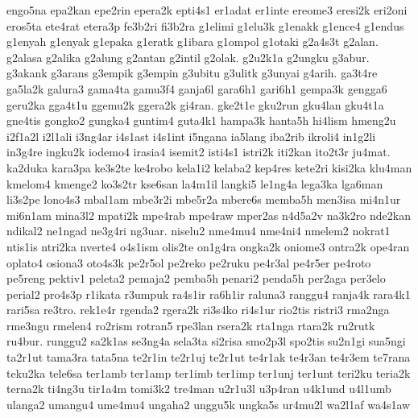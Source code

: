 {engo5na epa2kan epe2rin epera2k epti4s1 er1adat er1inte ereome3 eresi2k eri2oni eros5ta ete4rat etera3p fe3b2ri fi3b2ra g1elimi g1elu3k g1enakk g1ence4 g1endus g1enyah g1enyak g1epaka g1eratk g1ibara g1ompol g1otaki g2a4s3t g2alan. g2alasa g2alika g2alung g2antan g2intil g2olak. g2u2k1a g2ungku g3abur. g3akank g3arans g3empik g3empin g3ubitu g3ulitk g3unyai g4arih. ga3t4re ga5la2k galura3 gama4ta gamu3f4 ganja6l gara6h1 gari6h1 gempa3k gengga6 geru2ka gga4t1u ggemu2k ggera2k gi4ran. gke2t1e gku2run gku4lan gku4t1a gne4tis gongko2 gungka4 guntim4 guta4k1 hampa3k hanta5h hi4lism hmeng2u i2f1a2l i2l1ali i3ng4ar i4s1ast i4s1int i5ngana ia5lang iba2rib ikroli4 in1g2li in3g4re ingku2k iodemo4 irasia4 isemit2 isti4s1 istri2k iti2kan ito2t3r ju4mat. ka2duka kara3pa ke3s2te ke4robo kela1i2 kelaba2 kep4res kete2ri kisi2ka klu4man kmelom4 kmenge2 ko3s2tr kse6san la4m1il langki5 le1ng4a lega3ka lga6man li3s2pe lono4s3 mbal1am mbe3r2i mbe5r2a mbere6s memba5h men3isa mi4n1ur mi6n1am mina3l2 mpati2k mpe4rab mpe4raw mper2as n4d5a2v na3k2ro nde2kan ndikal2 ne1ngad ne3g4ri ng3uar. niselu2 nme4mu4 nme4ni4 nmelem2 nokrat1 ntis1is ntri2ka nverte4 o4s1ism olis2te on1g4ra ongka2k oniome3 ontra2k ope4ran oplato4 osiona3 oto4s3k pe2r5ol pe2reko pe2ruku pe4r3al pe4r5er pe4roto pe5reng pektiv1 peleta2 pemaja2 pemba5h penari2 penda5h per2aga per3elo perial2 pro4s3p r1ikata r3umpuk ra4s1ir ra6h1ir raluna3 ranggu4 ranja4k rara4k1 rari5sa re3tro. rek1e4r rgenda2 rgera2k ri3s4ko ri4s1ur rio2tis ristri3 rma2nga rme3ngu rmelen4 ro2rism rotran5 rpe3lan rsera2k rta1nga rtara2k ru2rutk ru4bur. runggu2 sa2k1as se3ng4a sela3ta si2risa smo2p3l spo2tis su2n1gi sua5ngi ta2r1ut tama3ra tata5na te2r1in te2r1uj te2r1ut te4r1ak te4r3an te4r3em te7rana teku2ka tele6sa ter1amb ter1amp ter1imb ter1imp ter1unj ter1unt teri2ku teria2k terna2k ti4ng3u tir1a4m tomi3k2 tre4man u2r1u3l u3p4ran u4k1und u4l1umb ulanga2 umangu4 ume4mu4 ungaha2 unggu5k ungka5s ur4mu2l wa2l1af wa4s1aw
}
